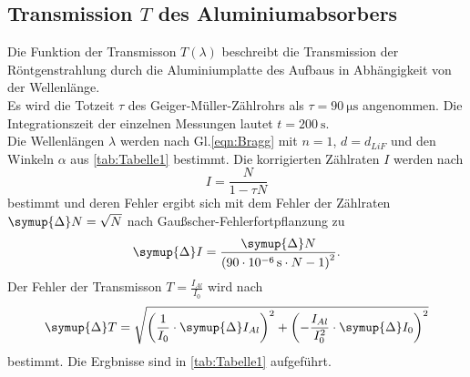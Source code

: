 \subsection{Transmission $T$ des Aluminiumabsorbers}
\label{subsec:transmission}

Die Funktion der Transmisson $T(\lambda)$ beschreibt die Transmission der 
Röntgenstrahlung durch die Aluminiumplatte des Aufbaus in Abhängigkeit von der Wellenlänge.\\

\noindent Es wird die Totzeit $\tau$ des Geiger-Müller-Zählrohrs als $\tau = \SI{90}{\micro\second}$ angenommen. Die 
Integrationszeit der einzelnen Messungen lautet $t = \SI{200}{\second}$. \\
Die Wellenlängen $\lambda$ werden nach Gl.\eqref{eqn:Bragg} mit $n=1$, $d=d_{LiF}$ und den Winkeln $\alpha$ aus \autoref{tab:Tabelle1} bestimmt.
Die korrigierten Zählraten $I$ werden nach
\begin{equation*}
  I = \frac{N}{1-\tau N}
\end{equation*}
bestimmt und deren Fehler ergibt sich mit dem Fehler der Zählraten $\symup{\Delta}N = \sqrt{N}$ nach Gaußscher-Fehlerfortpflanzung zu
\begin{equation*}
  \symup{\Delta}I = \frac{\symup{\Delta}N}{\left(\SI{90e-6}{\second}\cdot N-1\right)^2}.
\end{equation*}
Der Fehler der Transmisson $T = \frac{I_{Al}}{I_0}$ wird nach
\begin{equation*}
  \symup{\Delta}T=\sqrt{\left(\frac{1}{I_0}\cdot\symup{\Delta}I_{Al}\right)^2+\left(-\frac{I_{Al}}{I_0^2}\cdot\symup{\Delta}I_{0}\right)^2}
\end{equation*}
bestimmt. Die Ergbnisse sind in \autoref{tab:Tabelle1} aufgeführt.
